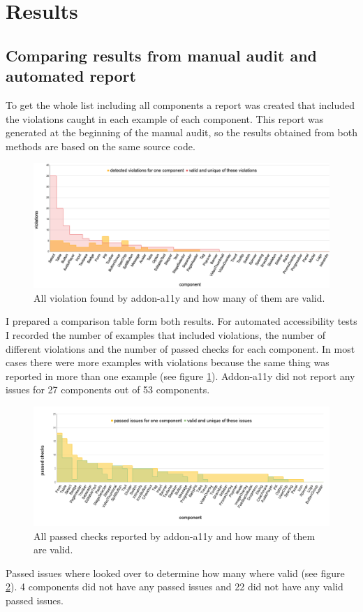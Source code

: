 \documentclass{master_thesis}
\begin{document}
\section{Results}


\subsection{Comparing results from manual audit and automated report}

To get the whole list including all components a report was created that included the violations caught in each example of each component. This report was generated at the beginning of the manual audit, so the results obtained from both methods are based on the same source code.
\begin{figure}[H]
	\includegraphics[width=\textwidth]{img/audit-failed.png}
	\caption{All violation found by addon-a11y and how many of them are valid.}
	\label{fig:audit-failed}
\end{figure}

I prepared a comparison table form both results. For automated accessibility tests I recorded the number of examples that included violations, the number of different violations and the number of passed checks for each component. In most cases there were more examples with violations because the same thing was reported in more than one example (see figure \ref{fig:audit-failed}). Addon-a11y did not report any issues for 27 components out of 53 components.

\begin{figure}[H]
	\includegraphics[width=\textwidth]{img/audit-passed.png}
	\caption{All passed checks reported by addon-a11y and how many of them are valid. }
	\label{fig:audit-passed}
\end{figure}
Passed issues where looked over to determine how many where valid (see figure \ref{fig:audit-passed}). 4 components did not have any passed issues and 22 did not have any valid passed issues.
\end{document}

